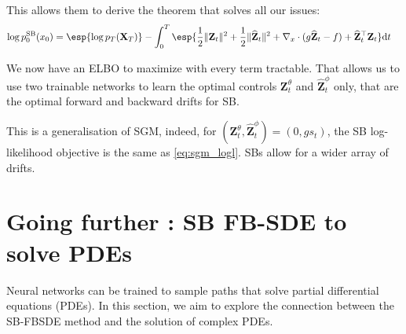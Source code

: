 \documentclass{article}
\begin{document}


This allows them to derive the theorem that solves all our issues:
\begin{equation}
\label{eq:logpSB}
\begin{aligned}
\log p_0^\mathrm{SB}(x_0) & = \esp{\log p_T(\mathbf{X}_T)}- \int_0^T \esp{\frac{1}{2}\|\mathbf{Z}_t\|^2 + \frac{1}{2}\|\widehat{\mathbf{Z}}_t\|^2 + \nabla_x \cdot (g\widehat{\mathbf{Z}}_t - f) + \widehat{\mathbf{Z}}_t^\top \mathbf{Z}_t} \dint t
\end{aligned}
\end{equation}

We now have an ELBO to maximize with every term tractable.
That allows us to use two trainable networks to learn the optimal controls $\mathbf{Z}_t^\theta$ and $\widehat{\mathbf{Z}}_t^\phi$ only, that are the optimal forward and backward drifts for SB.

This is a generalisation of SGM, indeed, for $(\mathbf{Z}_t^\theta, \widehat{\mathbf{Z}}_t^\phi) = (0, g s_t)$, the SB log-likelihood objective is the same as \eqref{eq:sgm_logl}. SBs allow for a wider array of drifts.



\section{Going further : SB FB-SDE to solve PDEs}

Neural networks can be trained to sample paths that solve partial differential equations (PDEs). In this section, we aim to explore the connection between the SB-FBSDE method and the solution of complex PDEs.
\end{document}
